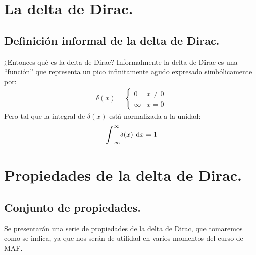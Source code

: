\documentclass[12pt]{article}
\def\scaleint#1{\vcenter{\hbox{\scaleto[3ex]{\displaystyle\int}{#1}}}}
\def\bs{\mkern-12mu}
\numberwithin{equation}{section}
\begin{document}

\section{La delta de Dirac.}
\subsection{Definición informal de la delta de Dirac.}


¿Entonces qué es la delta de Dirac? Informalmente la delta de Dirac es una \enquote{función} que representa un pico infinitamente agudo expresado simbólicamente por:
\begin{align}
\delta (x) = \begin{cases}
0 & x \neq 0 \\
\infty & x = 0
\end{cases}
\label{eq:ecuacion_delta_01}
\end{align}
Pero tal que la integral de $\delta (x)$ está normalizada a la unidad:
\begin{equation}
\scaleint{6ex}_{\bs -\infty}^{\infty} \delta (x) \: \dd{x} = 1 
\label{eq:ecuacion_delta_02}
\end{equation}


\section{Propiedades de la delta de Dirac.}
\subsection{Conjunto de propiedades.}

Se presentarán una serie de propiedades de la delta de Dirac, que tomaremos como se indica, ya que nos serán de utilidad en varios momentos del curso de MAF.
\end{document}
